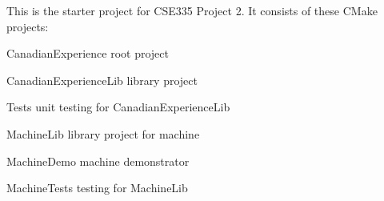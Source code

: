 This is the starter project for CSE335 Project 2. It consists of these CMake projects\+:


\begin{DoxyEnumerate}
\item Canadian\+Experience root project
\item Canadian\+Experience\+Lib library project
\item Tests unit testing for Canadian\+Experience\+Lib
\item Machine\+Lib library project for machine
\item Machine\+Demo machine demonstrator
\item Machine\+Tests testing for Machine\+Lib 
\end{DoxyEnumerate}